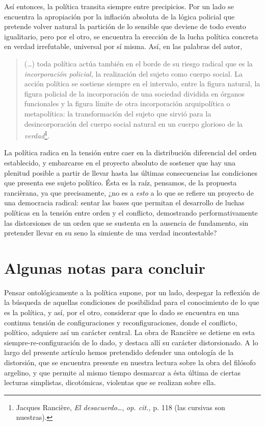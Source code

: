 Así entonces, la política transita siempre entre precipicios. Por un lado se encuentra la apropiación por la inflación absoluta de la lógica policial que pretende volver natural la partición de lo sensible que deviene de todo evento igualitario, pero por el otro, se encuentra la erección de la lucha política concreta en verdad irrefutable, universal por sí misma. Así, en las palabras del autor,

\begin{quote}
(\dots) toda política actúa también en el borde de su riesgo radical que es la \emph{incorporación policial,} la realización del sujeto como cuerpo social. La acción política se sostiene siempre en el intervalo, entre la figura natural, la figura policial de la incorporación de una sociedad dividida en órganos funcionales y la figura límite de otra incorporación arquipolítica o metapolítica: la transformación del sujeto que sirvió para la desincorporación del cuerpo social natural en un cuerpo glorioso de la \emph{verdad}\footnote{Jacques Rancière, \emph{El desacuerdo\ldots{}}, \emph{op. cit.,} p. 118 (las cursivas son nuestras).}.
\end{quote}

La política radica en la tensión entre caer en la distribución diferencial del orden establecido, y embarcarse en el proyecto absoluto de sostener que hay una plenitud posible a partir de llevar hasta las últimas consecuencias las condiciones que presenta ese sujeto político. Ésta es la raíz, pensamos, de la propuesta rancièrana, ya que precisamente, ¿no es a \emph{esto} a lo que se refiere un proyecto de una democracia radical: sentar las bases que permitan el desarrollo de luchas políticas en la tensión entre orden y el conflicto, demostrando performativamente las distorsiones de un orden que se sustenta en la ausencia de fundamento, sin pretender llevar en su seno la simiente de una verdad incontestable?

\section{Algunas notas para concluir}

Pensar ontológicamente a la política supone, por un lado, despegar la reflexión de la búsqueda de aquellas condiciones de posibilidad para el conocimiento de lo que es la política, y así, por el otro, considerar que lo dado se encuentra en una continua tensión de configuraciones y reconfiguraciones, donde el conflicto, político, adquiere así un carácter central. La obra de Rancière se detiene en esta siempre-re-configuración de lo dado, y destaca allí su carácter distorsionado. A lo largo del presente artículo hemos pretendido defender una ontología de la distorsión, que se encuentra presente en nuestra lectura sobre la obra del filósofo argelino, y que permite al mismo tiempo desmarcar a ésta última de ciertas lecturas simplistas, dicotómicas, violentas que se realizan sobre ella.

